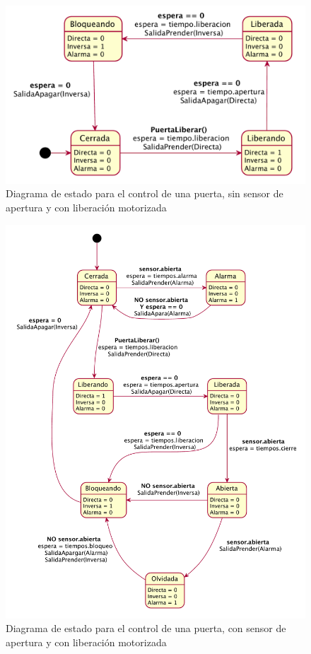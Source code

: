 \begin{itemize}
\begin{figure}[ht]
	\centering
	\includegraphics[scale=.5]{Figures/PNK-DE003.pdf}
	
	\caption{Diagrama de estado para el control de una puerta, sin sensor de apertura y con liberación motorizada}
	\label{fig:ControlConSin}
\end{figure}

\begin{figure}[ht]
	\centering
	\includegraphics[scale=.5]{Figures/PNK-DE004.pdf}
	\caption{Diagrama de estado para el control de una puerta, con sensor de apertura y con liberación motorizada}
	\label{fig:ControlConCon}
\end{figure}


\end{itemize}
